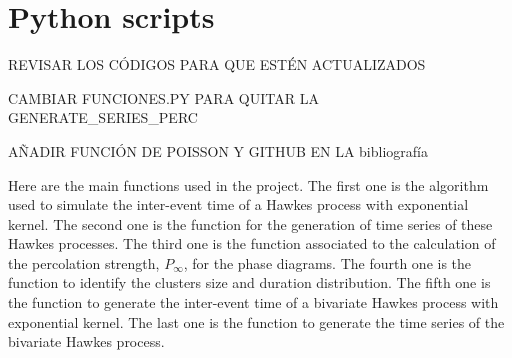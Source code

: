 \chapter{Python scripts}\label{ch:Anexo}
\begin{Large}
    REVISAR LOS CÓDIGOS PARA QUE ESTÉN ACTUALIZADOS

    CAMBIAR FUNCIONES.PY PARA QUITAR LA GENERATE\_SERIES\_PERC

    AÑADIR FUNCIÓN DE POISSON Y GITHUB EN LA bibliografía
\end{Large}
Here are the main functions used in the project. The first one is the algorithm used to simulate the inter-event time of a Hawkes process with exponential kernel. 
The second one is the function for the generation of time series of these Hawkes processes. The third one is the function associated to the calculation of the percolation strength, $P_\infty$,
for the phase diagrams. The fourth one is the function to identify the clusters size and duration distribution. The fifth one is the function to generate the inter-event time of a 
bivariate Hawkes process with exponential kernel. The last one is the function to generate the time series of the bivariate Hawkes process. 


